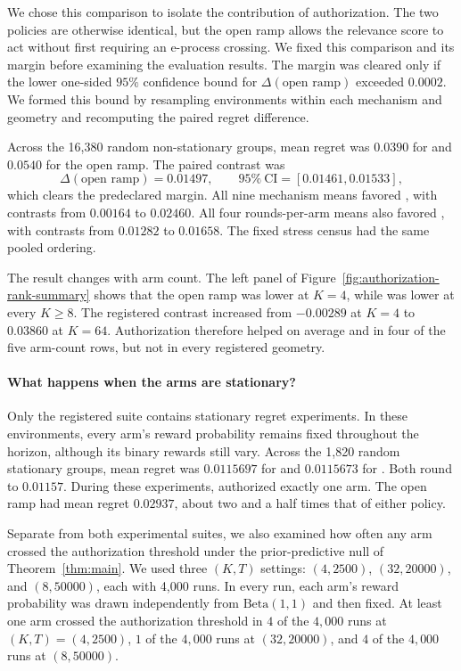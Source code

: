 We chose this comparison to isolate the contribution of authorization.
The two policies are otherwise identical, but the open ramp allows the relevance
score to act without first requiring an e-process crossing.
We fixed this comparison and its margin before examining the evaluation results.
The margin was cleared only if the lower one-sided $95\%$ confidence bound for
$\Delta(\text{open ramp})$ exceeded $0.0002$.
We formed this bound by resampling environments within each mechanism and geometry and recomputing the
paired regret difference.

Across the 16,380 random non-stationary groups, mean regret was $0.0390$ for
\method{} and $0.0540$ for the open ramp.
The paired contrast was
\[
 \Delta(\text{open ramp})
 =
 0.01497,
 \qquad
 95\%\ \mathrm{CI}
 =
 [0.01461,0.01533],
\]
which clears the predeclared margin.
All nine mechanism means favored \method{}, with contrasts from $0.00164$ to $0.02460$.
All four rounds-per-arm means also favored \method{}, with contrasts from $0.01282$ to
$0.01658$.
The fixed stress census had the same pooled ordering.

The result changes with arm count.
The left panel of Figure~\ref{fig:authorization-rank-summary} shows that the open ramp was lower
at $K=4$, while \method{} was lower at every $K\ge8$.
The registered contrast increased from $-0.00289$ at $K=4$ to $0.03860$ at $K=64$.
Authorization therefore helped on average and in four of the five arm-count rows, but not in
every registered geometry.

\paragraph{What happens when the arms are stationary?}
Only the registered suite contains stationary regret experiments.
In these environments, every arm's reward probability remains fixed throughout the
horizon, although its binary rewards still vary.
Across the 1,820 random stationary groups, mean regret was $0.0115697$ for \method{} and $0.0115673$
for \anchor{}.
Both round to $0.01157$.
During these experiments, \method{} authorized exactly one arm.
The open ramp had mean regret $0.02937$, about two and a half times that of either policy.

Separate from both experimental suites, we also examined how often any arm crossed
the authorization threshold under the prior-predictive null of
Theorem~\ref{thm:main}.
We used three $(K,T)$ settings:
$(4,2500)$, $(32,20000)$, and $(8,50000)$, each with 4,000 runs.
In every run, each arm's reward probability was drawn independently from
$\mathrm{Beta}(1,1)$ and then fixed.
At least one arm crossed the authorization threshold in $4$ of the $4,000$
runs at $(K,T)=(4,2500)$, $1$ of the $4,000$ runs at $(32,20000)$, and $4$ of
the $4,000$ runs at $(8,50000)$.

